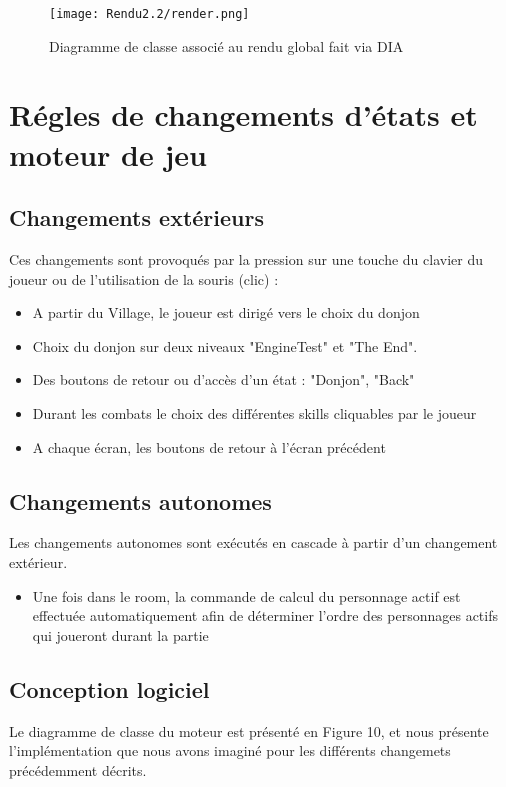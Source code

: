 \documentclass[a4paper,12pt]{article}
\begin{document}
\begin{figure}[!ht]
  \centering
  \texttt{[image: Rendu2.2/render.png]}
  \caption{Diagramme de classe associé au rendu global fait via DIA}
\end{figure}
\clearpage
\newpage 
\section{Régles de changements d'états et moteur de jeu}
\subsection{Changements extérieurs}
Ces changements sont provoqués par la pression sur une touche du clavier du joueur ou de l'utilisation de la souris (clic) : 
\begin{itemize}
    \item A partir du Village, le joueur est dirigé vers le choix du donjon
    \item Choix du donjon sur deux niveaux "EngineTest" et "The End".
    \item Des boutons de retour ou d'accès d'un état : "Donjon", "Back"
    \item Durant les combats le choix des différentes skills cliquables par le joueur
    \item A chaque écran, les boutons de retour à l'écran précédent
\end{itemize}

\subsection{Changements autonomes}
Les changements autonomes sont exécutés en cascade à partir d'un changement extérieur. 
\begin{itemize}
    \item Une fois dans le room, la commande de calcul du personnage actif est effectuée automatiquement afin de déterminer l'ordre des personnages actifs qui joueront durant la partie
\end{itemize}

\subsection{Conception logiciel}
Le diagramme de classe du moteur est présenté en Figure 10, et nous présente l'implémentation que nous avons imaginé pour les différents changemets précédemment décrits.
\end{document}
